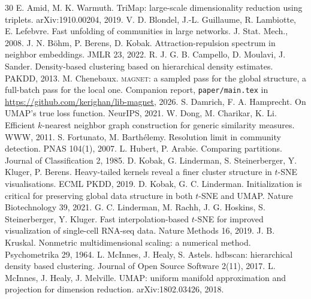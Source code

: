 \documentclass[10pt,twocolumn]{article}
\newcommand{\magnet}{\textsc{magnet}}
\begin{document}

\begin{thebibliography}{30}
 E. Amid, M. K. Warmuth. TriMap: large-scale dimensionality reduction using triplets. arXiv:1910.00204, 2019.
 V. D. Blondel, J.-L. Guillaume, R. Lambiotte, E. Lefebvre. Fast unfolding of communities in large networks. J. Stat. Mech., 2008.
 J. N. B\"ohm, P. Berens, D. Kobak. Attraction-repulsion spectrum in neighbor embeddings. JMLR 23, 2022.
 R. J. G. B. Campello, D. Moulavi, J. Sander. Density-based clustering based on hierarchical density estimates. PAKDD, 2013.
 M. Chenebaux. \magnet{}: a sampled pass for the global structure, a full-batch pass for the local one. Companion report, \texttt{paper/main.tex} in \url{https://github.com/kerighan/lib-magnet}, 2026.
 S. Damrich, F. A. Hamprecht. On UMAP's true loss function. NeurIPS, 2021.
 W. Dong, M. Charikar, K. Li. Efficient $k$-nearest neighbor graph construction for generic similarity measures. WWW, 2011.
 S. Fortunato, M. Barth\'elemy. Resolution limit in community detection. PNAS 104(1), 2007.
 L. Hubert, P. Arabie. Comparing partitions. Journal of Classification 2, 1985.
 D. Kobak, G. Linderman, S. Steinerberger, Y. Kluger, P. Berens. Heavy-tailed kernels reveal a finer cluster structure in $t$-SNE visualisations. ECML PKDD, 2019.
 D. Kobak, G. C. Linderman. Initialization is critical for preserving global data structure in both $t$-SNE and UMAP. Nature Biotechnology 39, 2021.
 G. C. Linderman, M. Rachh, J. G. Hoskins, S. Steinerberger, Y. Kluger. Fast interpolation-based $t$-SNE for improved visualization of single-cell RNA-seq data. Nature Methods 16, 2019.
 J. B. Kruskal. Nonmetric multidimensional scaling: a numerical method. Psychometrika 29, 1964.
 L. McInnes, J. Healy, S. Astels. hdbscan: hierarchical density based clustering. Journal of Open Source Software 2(11), 2017.
 L. McInnes, J. Healy, J. Melville. UMAP: uniform manifold approximation and projection for dimension reduction. arXiv:1802.03426, 2018.

\end{thebibliography}
\end{document}
